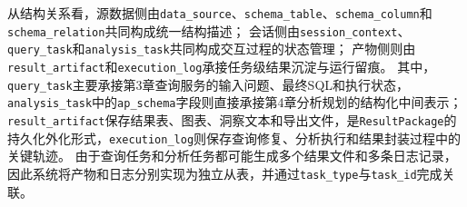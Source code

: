 从结构关系看，源数据侧由\texttt{data\_source}、\texttt{schema\_table}、\texttt{schema\_column}和\texttt{schema\_relation}共同构成统一结构描述；
会话侧由\texttt{session\_context}、\texttt{query\_task}和\texttt{analysis\_task}共同构成交互过程的状态管理；
产物侧则由\texttt{result\_artifact}和\texttt{execution\_log}承接任务级结果沉淀与运行留痕。
其中，\texttt{query\_task}主要承接第3章查询服务的输入问题、最终SQL和执行状态，\texttt{analysis\_task}中的\texttt{ap\_schema}字段则直接承接第4章分析规划的结构化中间表示；\texttt{result\_artifact}保存结果表、图表、洞察文本和导出文件，是\texttt{ResultPackage}的持久化外化形式，\texttt{execution\_log}则保存查询修复、分析执行和结果封装过程中的关键轨迹。
由于查询任务和分析任务都可能生成多个结果文件和多条日志记录，因此系统将产物和日志分别实现为独立从表，并通过\texttt{task\_type}与\texttt{task\_id}完成关联。

